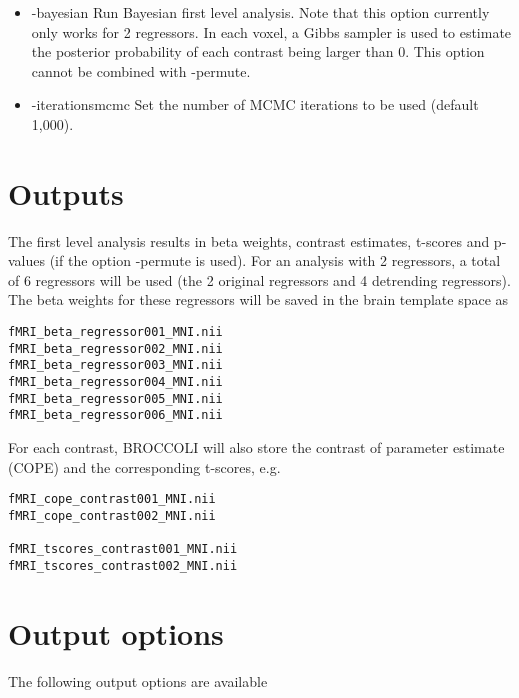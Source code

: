 \begin{itemize}
\item -bayesian 
\newline \newline Run Bayesian first level analysis.  Note that this option currently only works for 2 regressors. In each voxel, a Gibbs sampler is used to estimate the posterior probability of each contrast being larger than 0. This option cannot be combined with -permute.

\item -iterationsmcmc 
\newline \newline Set the number of MCMC iterations to be used (default 1,000).

\end{itemize}

\section{Outputs}

The first level analysis results in beta weights, contrast estimates, t-scores and p-values (if the option -permute is used). For an analysis with 2 regressors, a total of 6 regressors will be used (the 2 original regressors and 4 detrending regressors). The beta weights for these regressors will be saved in the brain template space as

\begin{verbatim}
fMRI_beta_regressor001_MNI.nii 
fMRI_beta_regressor002_MNI.nii 
fMRI_beta_regressor003_MNI.nii 
fMRI_beta_regressor004_MNI.nii 
fMRI_beta_regressor005_MNI.nii 
fMRI_beta_regressor006_MNI.nii 
\end{verbatim}
For each contrast, BROCCOLI will also store the contrast of parameter estimate (COPE) and the corresponding t-scores, e.g.

\begin{verbatim}
fMRI_cope_contrast001_MNI.nii  
fMRI_cope_contrast002_MNI.nii  

fMRI_tscores_contrast001_MNI.nii
fMRI_tscores_contrast002_MNI.nii
\end{verbatim}

\section{Output options}

The following output options are available

